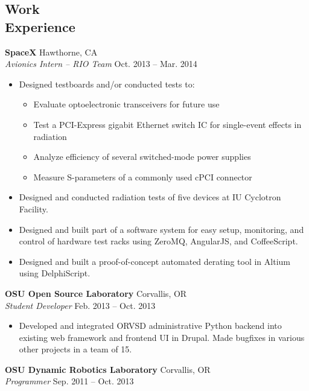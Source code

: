 \documentclass[10pt,letterpaper,margin]{res}
\begin{document}
\begin{resume}
\section{Work \\ Experience}

{\bf SpaceX} \hfill {\color{lightgray} Hawthorne, CA} \\
{\it Avionics Intern -- RIO Team} \hfill {\color{lightgray} Oct. 2013 -- Mar. 2014}\vspace{0.0em}

\begin{itemize}
	\item Designed testboards and/or conducted tests to:
		\begin{itemize}
			\item Evaluate optoelectronic transceivers for future use
			\item Test a PCI-Express gigabit Ethernet switch IC for
				single-event effects in radiation
			\item Analyze efficiency of several switched-mode power supplies
			\item Measure S-parameters of a commonly used cPCI connector
		\end{itemize}
	\item Designed and conducted radiation tests of five devices at IU
		Cyclotron Facility.
	\item Designed and built part of a software system for easy setup,
		monitoring, and control of hardware test racks using ZeroMQ, AngularJS,
		and CoffeeScript.
	\item Designed and built a proof-of-concept automated derating tool in
		Altium using DelphiScript.
\end{itemize}


{\bf OSU Open Source Laboratory} \hfill {\color{lightgray} Corvallis, OR} \\
{\it Student Developer} \hfill {\color{lightgray} Feb. 2013 -- Oct. 2013}\vspace{0.0em}

\begin{itemize}
	\item Developed and integrated ORVSD administrative Python backend into
		existing web framework and frontend UI in Drupal. Made bugfixes in
		various other projects in a team of 15.
\end{itemize}


{\bf OSU Dynamic Robotics Laboratory} \hfill {\color{lightgray} Corvallis, OR} \\
{\it Programmer} \hfill {\color{lightgray} Sep. 2011 -- Oct. 2013}\vspace{0.0em}


\end{resume}
\end{document}
